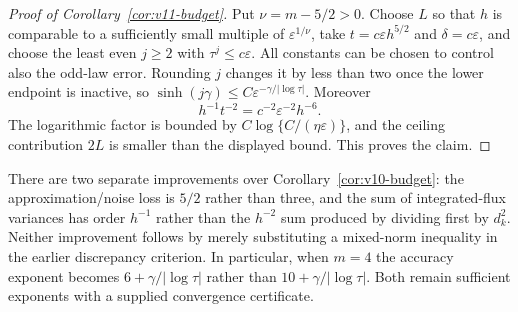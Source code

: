 \begin{proof}[Proof of Corollary~\ref{cor:v11-budget}]
Put $\nu=m-5/2>0$. Choose $L$ so that $h$ is comparable to a
sufficiently small multiple of $\varepsilon^{1/\nu}$, take
$t=c\varepsilon h^{5/2}$ and $\delta=c\varepsilon$, and choose
the least even $j\ge2$ with $\tau^j\le c\varepsilon$.
All constants can be chosen to control also the odd-law error.
Rounding $j$ changes it by less than two once the lower endpoint is
inactive, so $\sinh(j\gamma)\le
C\varepsilon^{-\gamma/|\log\tau|}$. Moreover
\[
 h^{-1}t^{-2}=c^{-2}\varepsilon^{-2}h^{-6}.
\]
The logarithmic factor is bounded by
$C\log\{C/(\eta\varepsilon)\}$, and the ceiling contribution
$2L$ is smaller than the displayed bound. This proves the claim.
\end{proof}

There are two separate improvements over
Corollary~\ref{cor:v10-budget}: the approximation/noise loss is
$5/2$ rather than three, and the sum of integrated-flux variances has
order $h^{-1}$ rather than the $h^{-2}$ sum produced by dividing
first by $d_k^2$. Neither improvement follows by merely substituting
a mixed-norm inequality in the earlier discrepancy criterion. In
particular, when $m=4$ the accuracy exponent becomes
$6+\gamma/|\log\tau|$ rather than
$10+\gamma/|\log\tau|$. Both remain sufficient exponents with a
supplied convergence certificate.
